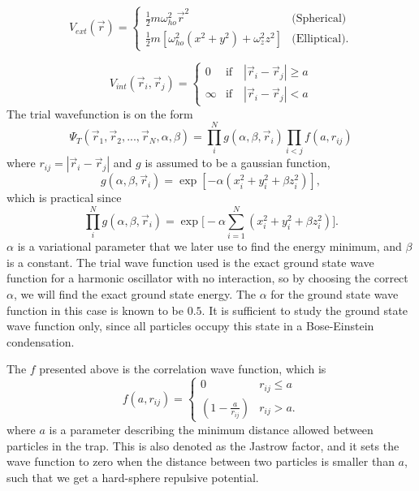\documentclass[norsk,a4paper,12pt]{article}
\begin{document}
\begin{equation}
\label{eq:V_ext}
V_{ext}(\vec{r})=
\begin{cases} 
   \frac{1}{2}m\omega_{ho}^2\vec{r}^2 & \text{(Spherical)} \\
   \frac{1}{2}m[\omega_{ho}^2(x^2 + y^2) + \omega_z^2z^2] & \text{(Elliptical)}.
\end{cases}
\end{equation}

\begin{equation}
\label{eq:V_int}
V_{int}(\vec{r}_i, \vec{r}_j)=
\begin{cases} 
0 & \text{if}\quad |\vec{r}_i-\vec{r}_j| \geq a \\
\infty & \text{if}\quad |\vec{r}_i-\vec{r}_j| < a
\end{cases}
\end{equation}
The trial wavefunction is on the form 
\begin{equation}
\Psi_T(\vec{r}_1, \vec{r}_2, ..., \vec{r}_N, \alpha, \beta)=\prod_i^Ng(\alpha, \beta, \vec{r}_i)\prod_{i<j}f(a,r_{ij})
\label{eq:WF}
\end{equation}
where $r_{ij}=|\vec{r}_i-\vec{r}_j|$ and $g$ is assumed to be a gaussian function,
\begin{equation}
g(\alpha, \beta, \vec{r}_i)=\exp[-\alpha(x_i^2+y_i^2+\beta z_i^2)],
\end{equation}
which is practical since
\begin{equation}
\prod_i^Ng(\alpha, \beta, \vec{r}_i)=\exp\Big[-\alpha\sum_{i=1}^N(x_i^2+y_i^2+\beta z_i^2)\Big].
\end{equation}
$\alpha$ is a variational parameter that we later use to find the energy minimum, and $\beta$ is a constant. The trial wave function used is the exact ground state wave function for a harmonic oscillator with no interaction, so by choosing the correct $\alpha$, we will find the exact ground state energy. The $\alpha$ for the ground state wave function in this case is known to be $0.5$. It is sufficient to study the ground state wave function only, since all particles occupy this state in a Bose-Einstein condensation.

The $f$ presented above is the correlation wave function, which is 
\begin{equation}
\label{eq:WF_interaction_part}
f(a,r_{ij})=
\begin{cases} 
   0 & r_{ij} \leq a \\
   \left(1-\frac{a}{r_{ij}}\right) & r_{ij} > a.
\end{cases}
\end{equation}
where $a$ is a parameter describing the minimum distance allowed between particles in the trap. This is also denoted as the Jastrow factor, and it sets the wave function to zero when the distance between two particles is smaller than $a$, such that we get a hard-sphere repulsive potential. 
\end{document}
